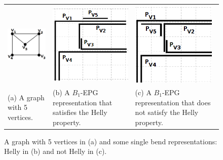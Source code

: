 
\begin{figure}[h]
  \centering
  \begin{tabular}{ p{3.2cm} p{4.5cm} p{4.5cm} }
    \centering \includegraphics[width=3cm]{./img/envelope} & \includegraphics[width=4cm]{./img/envelopeHellyGradeTransparente} & \includegraphics[width=4cm]{./img/envelopeNaoHellyGrade}
    \\
    \footnotesize \centering (a) A  graph with 5 vertices. & \footnotesize(b) A $B_1$-EPG representation that satisfies the Helly property. & \footnotesize (c) A $B_1$-EPG representation that does  not satisfy the Helly property.  \\

  \end{tabular}
\caption{A  graph with 5 vertices in (a) and some single bend representations: Helly in (b) and not Helly in (c).} \label{fig:envelopeRepresentacoes}
\end{figure}

